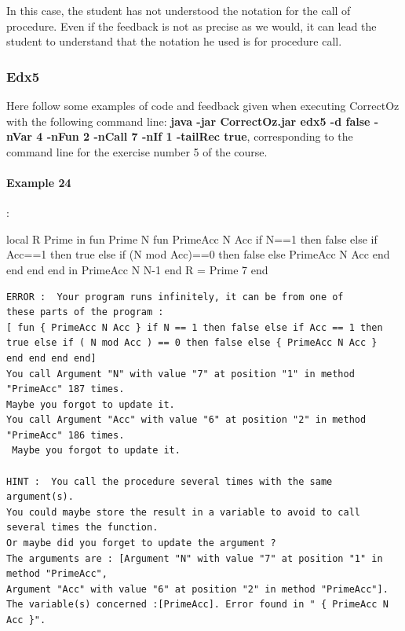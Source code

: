 \documentclass[11pt,a4paper,twoside,openright]{report}
\begin{document}
In this case, the student has not understood the notation for the call of 
procedure. Even if the feedback is not as precise as we would, it can lead the
student to understand that the notation he used is for procedure call.

\subsubsection{Edx5}
Here follow some examples of code and feedback given when executing 
CorrectOz with the following command line: \textbf{java -jar CorrectOz.jar edx5 -d 
false -nVar 4 -nFun 2 -nCall 7 -nIf 1  -tailRec true}, 
corresponding to the command line for the exercise number 5 of the course.

\paragraph{Example 24}:

\begin{OZ}
local R Prime in
	fun {Prime N}
			fun {PrimeAcc N Acc}
				if N==1 then false
					else if Acc==1 then true
						else if (N mod Acc)==0 then false
							else {PrimeAcc N Acc}
							end
						end
					end
				end
			in {PrimeAcc N N-1}
	end
	R = {Prime 7}
end
\end{OZ}
\newpage
\begin{lstlisting}
ERROR :  Your program runs infinitely, it can be from one of 
these parts of the program : 
[ fun { PrimeAcc N Acc } if N == 1 then false else if Acc == 1 then 
true else if ( N mod Acc ) == 0 then false else { PrimeAcc N Acc } 
end end end end]
You call Argument "N" with value "7" at position "1" in method "PrimeAcc" 187 times. 
Maybe you forgot to update it.
You call Argument "Acc" with value "6" at position "2" in method "PrimeAcc" 186 times.
 Maybe you forgot to update it.

HINT :  You call the procedure several times with the same argument(s). 
You could maybe store the result in a variable to avoid to call several times the function. 
Or maybe did you forget to update the argument ? 
The arguments are : [Argument "N" with value "7" at position "1" in method "PrimeAcc", 
Argument "Acc" with value "6" at position "2" in method "PrimeAcc"].
The variable(s) concerned :[PrimeAcc]. Error found in " { PrimeAcc N Acc }".

\end{lstlisting}
\end{document}
